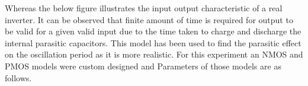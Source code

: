 \documentclass[a4paper,11pt]{article}%
\begin{document}
\begin{figure}[H]
	\centering
	\hfill
\end{figure}

Whereas the below figure illustrates the input output characteristic of a real inverter. It can be observed that finite amount of time is required for output to be valid for a given valid input due to the time taken to charge and discharge the internal parasitic capacitors. This model has  been used to find the parasitic effect on the oscillation period as it is more realistic. For this experiment an NMOS and PMOS models were custom designed and Parameters of those models are as follows.
\end{document}
